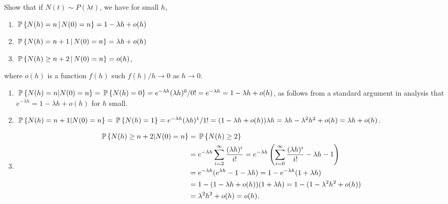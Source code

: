 \begin{question}
  Show that if $N(t) \sim P(\lambda t)$, we have for small $h$,
  \begin{enumerate}
  \item $\P{N(h) = n \given N(0) = n} = 1-\lambda h + o(h)$ 
  \item $\P{N(h) = n+1 \given N(0) = n} = \lambda h + o(h)$ 
  \item $\P{N(h) \geq n+2 \given N(0) = n} = o(h)$,
  \end{enumerate}
 where $o(h)$ is a function
    $f(h)$ such $f(h)/h \to 0$ as $h\to 0$.


\begin{solution}

\begin{enumerate}
  \item 
  $\P{N(h) = n | N(0) = n} = \P{N(h) = 0} = e^{-\lambda h} (\lambda
  h)^0/0! = e^{-\lambda h} = 1-\lambda h + o(h)$,
  as follows from a standard argument in analysis that
  $e^{-\lambda h} = 1 -\lambda h + o(h)$  for $h$ small. 
\item 
  $\P{N(h) = n +1 | N(0) = n} = \P{N(h) = 1} = e^{-\lambda h} (\lambda h)^1/1! = 
(1-\lambda h + o(h))\lambda h  = \lambda h - \lambda^2 h^2 + o(h) = \lambda h + o(h)$. 
\item 
  \begin{equation*}
    \begin{split}
  \P{N(h) \geq n+2 | N(0) = n} 
&= \P{N(h) \geq 2} \\
&= e^{-\lambda h} \sum_{i=2}^\infty \frac{(\lambda h)^i}{i!} 
= e^{-\lambda h} \left(\sum_{i=0}^\infty \frac{(\lambda h)^i}{i!} - \lambda h - 1\right)\\
&= e^{-\lambda h}(e^{\lambda h} - 1 - \lambda h) 
= 1 - e^{-\lambda h}(1 + \lambda h) \\
&= 1 - (1-\lambda h + o(h))(1+\lambda h) 
= 1 - (1-\lambda^2 h^2 + o(h)) \\
&= \lambda^2 h^2 + o(h) = o(h).
    \end{split}
  \end{equation*}
\end{enumerate}
\end{solution}
\end{question}


